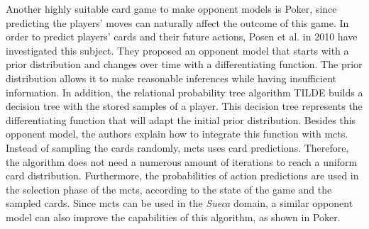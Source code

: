 Another highly suitable card game to make opponent models is Poker, since predicting the players' moves can naturally affect the outcome of this game.
In order to predict players' cards and their future actions, Posen et al. in 2010 \cite{Ponsen2008} have investigated this subject.
They proposed an opponent model that starts with a prior distribution and changes over time with a differentiating function.
The prior distribution allows it to make reasonable inferences while having insufficient information.
In addition, the relational probability tree algorithm TILDE builds a decision tree with the stored samples of a player.
This decision tree represents the differentiating function that will adapt the initial prior distribution.
Besides this opponent model, the authors explain how to integrate this function with \gls{mcts}.
Instead of sampling the cards randomly, \gls{mcts} uses card predictions.
Therefore, the algorithm does not need a numerous amount of iterations to reach a uniform card distribution.
Furthermore, the probabilities of action predictions are used in the selection phase of the \gls{mcts}, according to the state of the game and the sampled cards.
Since \gls{mcts} can be used in the \emph{Sueca} domain, a similar opponent model can also improve the capabilities of this algorithm, as shown in Poker.

\begin{table}[h]
\end{table}

 
 